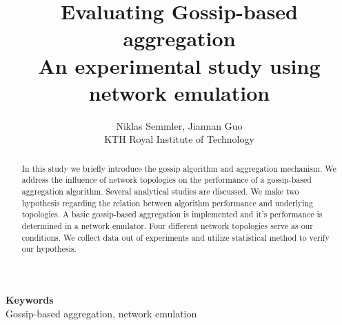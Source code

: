 \documentclass[11pt,a4paper]{article}
\date{}
\def\keywords#1{\begin{center}{\bf Keywords}\\{#1}\end{center}} %
\begin{document}
\title{Evaluating Gossip-based aggregation\\An experimental study using network emulation}

\author{
Niklas Semmler, Jiannan Guo\\
KTH Royal Institute of Technology\\
}%

\maketitle

\begin{abstract}
In this study we briefly introduce the gossip algorithm and aggregation mechanism. We address the influence of network topologies on the performance of a gossip-based aggregation algorithm. Several analytical studies are discussed. We make two hypothesis regarding the relation between algorithm performance and underlying topologies. A basic gossip-based aggregation is implemented and it's performance is determined in a network emulator. Four different network topologies serve as our conditions. We collect data out of experiments and utilize statistical method to verify our hypothesis.
\end{abstract}

\keywords{Gossip-based aggregation, network emulation}%

\newpage
\tableofcontents
\newpage








\newpage



\appendix
\end{document}
